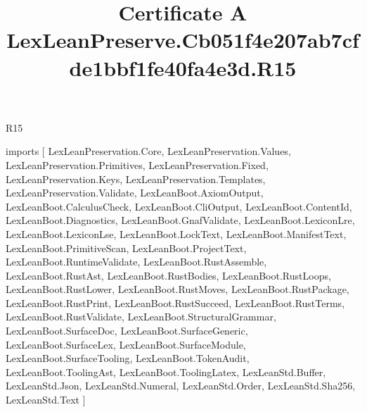 \begin{lexlean}{R15}
\title{Certificate A LexLeanPreserve.Cb051f4e207ab7cfde1bbf1fe40fa4e3d.R15}
\begin{coremodule}
imports [
  LexLeanPreservation.Core,
  LexLeanPreservation.Values,
  LexLeanPreservation.Primitives,
  LexLeanPreservation.Fixed,
  LexLeanPreservation.Keys,
  LexLeanPreservation.Templates,
  LexLeanPreservation.Validate,
  LexLeanBoot.AxiomOutput,
  LexLeanBoot.CalculusCheck,
  LexLeanBoot.CliOutput,
  LexLeanBoot.ContentId,
  LexLeanBoot.Diagnostics,
  LexLeanBoot.GnafValidate,
  LexLeanBoot.LexiconLre,
  LexLeanBoot.LexiconLse,
  LexLeanBoot.LockText,
  LexLeanBoot.ManifestText,
  LexLeanBoot.PrimitiveScan,
  LexLeanBoot.ProjectText,
  LexLeanBoot.RuntimeValidate,
  LexLeanBoot.RustAssemble,
  LexLeanBoot.RustAst,
  LexLeanBoot.RustBodies,
  LexLeanBoot.RustLoops,
  LexLeanBoot.RustLower,
  LexLeanBoot.RustMoves,
  LexLeanBoot.RustPackage,
  LexLeanBoot.RustPrint,
  LexLeanBoot.RustSucceed,
  LexLeanBoot.RustTerms,
  LexLeanBoot.RustValidate,
  LexLeanBoot.StructuralGrammar,
  LexLeanBoot.SurfaceDoc,
  LexLeanBoot.SurfaceGeneric,
  LexLeanBoot.SurfaceLex,
  LexLeanBoot.SurfaceModule,
  LexLeanBoot.SurfaceTooling,
  LexLeanBoot.TokenAudit,
  LexLeanBoot.ToolingAst,
  LexLeanBoot.ToolingLatex,
  LexLeanStd.Buffer,
  LexLeanStd.Json,
  LexLeanStd.Numeral,
  LexLeanStd.Order,
  LexLeanStd.Sha256,
  LexLeanStd.Text
]


\end{coremodule}
\end{lexlean}
